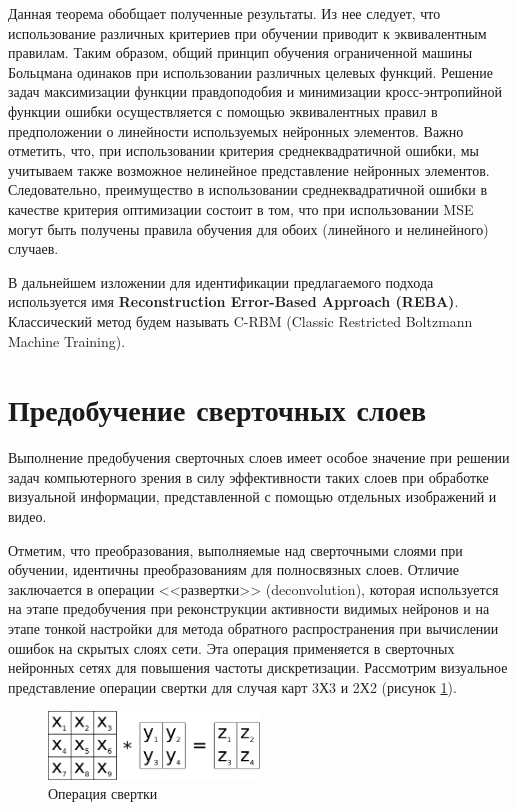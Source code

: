 Данная теорема обобщает полученные результаты. Из нее следует, что использование различных критериев при обучении приводит к эквивалентным правилам. Таким образом, общий принцип обучения ограниченной машины Больцмана одинаков при использовании различных целевых функций. Решение задач максимизации функции правдоподобия и минимизации кросс-энтропийной функции ошибки осуществляется с помощью эквивалентных правил в предположении о линейности используемых нейронных элементов. Важно отметить, что, при использовании критерия среднеквадратичной ошибки, мы учитываем также возможное нелинейное представление нейронных элементов. Следовательно, преимущество в использовании среднеквадратичной ошибки в качестве критерия оптимизации состоит в том, что при использовании MSE могут быть получены правила обучения для обоих (линейного и нелинейного) случаев.

В дальнейшем изложении для идентификации предлагаемого подхода используется имя \textbf{Reconstruction Error-Based Approach (REBA)}. Классический метод будем называть C-RBM (Classic Restricted Boltzmann Machine Training).

\section{Предобучение сверточных слоев}

Выполнение предобучения сверточных слоев имеет особое значение при решении задач компьютерного зрения в силу эффективности таких слоев при обработке визуальной информации, представленной с помощью отдельных изображений и видео.

Отметим, что преобразования, выполняемые над сверточными слоями при обучении, идентичны преобразованиям для полносвязных слоев. 
Отличие заключается в операции <<развертки>> (deconvolution), которая используется на этапе предобучения при реконструкции активности видимых нейронов и на этапе тонкой настройки для метода обратного распространения при вычислении ошибок на скрытых слоях сети. Эта операция применяется в сверточных нейронных сетях для повышения частоты дискретизации.
Рассмотрим визуальное представление операции свертки для случая карт 3Х3 и 2Х2 (рисунок \ref{fig:convolution}).

\begin{figure}[H]
  \centering
  \includegraphics[width=0.5\textwidth]{man-source/images/ch2/pic2-4.png}
  \caption{Операция свертки}
  \label{fig:convolution}
\end{figure}

